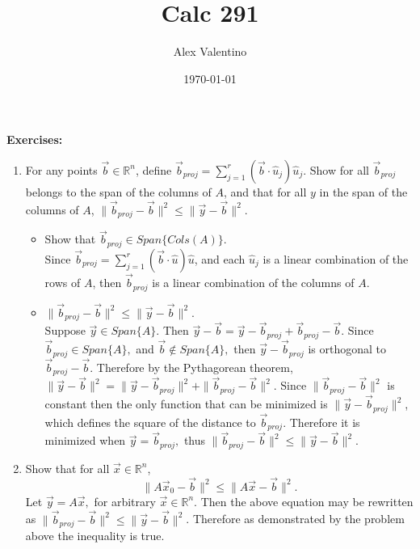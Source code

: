 \documentclass[12pt, letterpaper]{article}
\date{\today}
\author{Alex Valentino}
\title{Calc 291}
\newcommand{\R}{\mathbb{R}}
\begin{document}
	\textbf{Exercises:}\\
	\begin{enumerate}
		\item For any points $\vec{b} \in \R^n$, define $\vec{b}_{proj} = \displaystyle \sum_{j=1}^r (\vec{b}\cdot \hat{u}_j) \hat{u}_j$.  Show for all $\vec{b}_{proj}$ belongs to the span of the columns of $A$, and that for all $y$ in the span of the
columns of $A$,  $\| \vec{b}_{proj} - \vec{b} \|^2 \leq \|\vec{y}-\vec{b}\|^2$.\\
		\begin{itemize}
			\item Show that $\vec{b}_{proj} \in Span\{Cols(A)\}.$\\
			Since $\vec{b}_{proj} = \displaystyle \sum_{j=1}^r (\vec{b}\cdot \hat{u}) \hat{u}$, and each $\hat{u}_j$ is a linear combination of the rows of $A$, then $\vec{b}_{proj}$ is a linear combination of the columns of $A$. 
			\item $\| \vec{b}_{proj} - \vec{b} \|^2 \leq \|\vec{y}-\vec{b}\|^2$.\\
			Suppose $\vec{y} \in Span\{A\}$.  Then $\vec{y}-\vec{b} = \vec{y} - \vec{b}_{proj} + \vec{b}_{proj} - \vec{b}.$  Since $ \vec{b}_{proj} \in Span\{A\},$ and $\vec{b} \not \in Span\{A\},$ then $\vec{y} - \vec{b}_{proj}$ is orthogonal to $\vec{b}_{proj} - \vec{b}$.  Therefore by the Pythagorean theorem,  $ \|\vec{y}-\vec{b}\|^2 = \|\vec{y} - \vec{b}_{proj}\|^2 + \|\vec{b}_{proj} - \vec{b}\|^2.$  Since $\|\vec{b}_{proj} - \vec{b}\|^2$ is constant then the only function that can be minimized is $\|\vec{y} - \vec{b}_{proj}\|^2$, which defines the square of the distance to $\vec{b}_{proj}.$  Therefore it is minimized when $\vec{y} = \vec{b}_{proj},$ thus $ \| \vec{b}_{proj} - \vec{b}\|^2 \leq \|\vec{y}-\vec{b}\|^2$.
		\end{itemize}
		\item Show that for all $\vec{x} \in \mathbb{R}^n$,
		$$
			\|A \vec{x}_0-\vec{b} \|^2 \leq\|A \vec{x}-\vec{b}\|^2 .
		$$
			Let $\vec{y} = A \vec{x},$ for arbitrary $\vec{x} \in \R^n.$  Then the above equation may be rewritten as $\| \vec{b}_{proj} - \vec{b} \|^2 \leq \|\vec{y}-\vec{b}\|^2$.  Therefore as demonstrated by the problem above the inequality is true.  
	

\end{enumerate}
\end{document}

